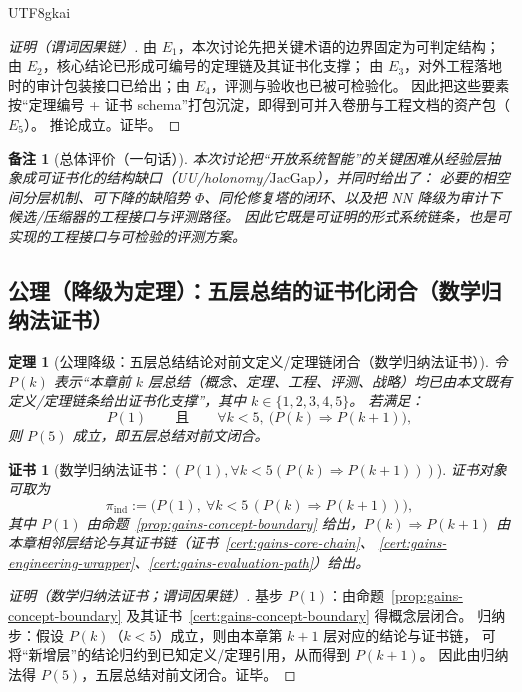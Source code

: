 \documentclass[12pt]{article}
\newtheorem{theorem}{定理}[section]
\newtheorem{remark}{备注}[section]
\newtheorem{Certificate}{证书}[section]
\newcommand{\JacGap}{\ensuremath{\mathrm{JacGap}}} %
\begin{document}
\begin{CJK*}{UTF8}{gkai}
\begin{proof}[证明（谓词因果链）]
由 $E_1$，本次讨论先把关键术语的边界固定为可判定结构；由 $E_2$，核心结论已形成可编号的定理链及其证书化支撑；
由 $E_3$，对外工程落地时的审计包装接口已给出；由 $E_4$，评测与验收也已被可检验化。
因此把这些要素按“定理编号 + 证书 schema”打包沉淀，即得到可并入卷册与工程文档的资产包（$E_5$）。
推论成立。证毕。
\end{proof}

\begin{remark}[总体评价（一句话）]
本次讨论把“开放系统智能”的关键困难从经验层抽象成可证书化的结构缺口（UU/holonomy/$\JacGap$），并同时给出了：
必要的相空间分层机制、可下降的缺陷势 $\Phi$、同伦修复塔的闭环、以及把 NN 降级为审计下候选/压缩器的工程接口与评测路径。
因此它既是可证明的形式系统链条，也是可实现的工程接口与可检验的评测方案。
\end{remark}

\subsection{公理（降级为定理）：五层总结的证书化闭合（数学归纳法证书）}
\label{sec:gains-induction-schema}

\begin{theorem}[公理降级：五层总结结论对前文定义/定理链闭合（数学归纳法证书）]
\label{thm:gains-five-layer-induction}
令 $P(k)$ 表示“本章前 $k$ 层总结（概念、定理、工程、评测、战略）均已由本文既有定义/定理链条给出证书化支撑”，其中 $k\in\{1,2,3,4,5\}$。
若满足：
\[
  P(1)\qquad\text{且}\qquad \forall k<5,\ \bigl(P(k)\Rightarrow P(k+1)\bigr),
\]
则 $P(5)$ 成立，即五层总结对前文闭合。
\end{theorem}

\begin{Certificate}[数学归纳法证书：$(P(1),\forall k<5(P(k)\Rightarrow P(k+1)))$]
\label{cert:gains-five-layer-induction}
证书对象可取为
\[
  \pi_{\mathrm{ind}}
  :=\bigl(P(1),\ \forall k<5\,(P(k)\Rightarrow P(k+1))\bigr),
\]
其中 $P(1)$ 由命题~\ref{prop:gains-concept-boundary} 给出，$P(k)\Rightarrow P(k+1)$ 由本章相邻层结论与其证书链（证书~\ref{cert:gains-core-chain}、
  \ref{cert:gains-engineering-wrapper}、\ref{cert:gains-evaluation-path}）给出。
\end{Certificate}

\begin{proof}[证明（数学归纳法证书；谓词因果链）]
基步 $P(1)$：由命题~\ref{prop:gains-concept-boundary} 及其证书~\ref{cert:gains-concept-boundary} 得概念层闭合。
归纳步：假设 $P(k)$（$k<5$）成立，则由本章第 $k+1$ 层对应的结论与证书链，
可将“新增层”的结论归约到已知定义/定理引用，从而得到 $P(k+1)$。
因此由归纳法得 $P(5)$，五层总结对前文闭合。证毕。
\end{proof}


\end{CJK*}
\end{document}
